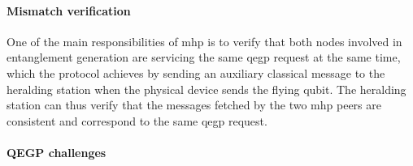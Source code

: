 \paragraph{Mismatch verification}

One of the main responsibilities of \acrshort{mhp} is to verify that both nodes involved in
entanglement generation are servicing the same \acrshort{qegp} request at the same time, which the
protocol achieves by sending an auxiliary classical message to the heralding station when the
physical device sends the flying qubit. The heralding station can thus verify that the messages
fetched by the two \acrshort{mhp} peers are consistent and correspond to the same \acrshort{qegp}
request.

\paragraph{QEGP challenges}

